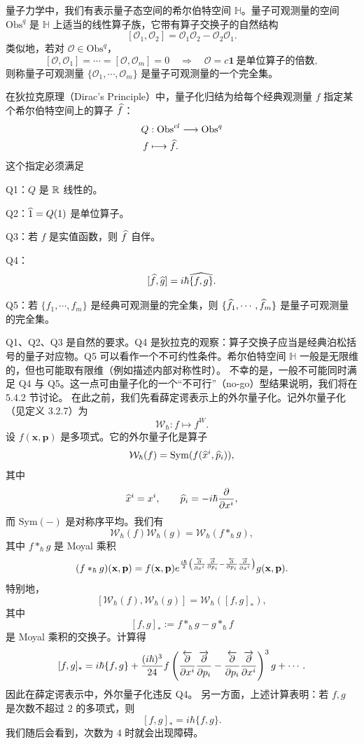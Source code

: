 量子力学中，我们有表示量子态空间的希尔伯特空间 $\mathbb{H}$。量子可观测量的空间
$\mathrm{Obs}^{q}$ 是 $\mathbb{H}$ 上适当的线性算子族，它带有算子交换子的自然结构
\[
[\mathcal{O}_1,\mathcal{O}_2]
=\mathcal{O}_1\mathcal{O}_2-\mathcal{O}_2\mathcal{O}_1.
\]
类似地，若对 $\mathcal{O}\in\mathrm{Obs}^{q}$，
\[
[\mathcal{O},\mathcal{O}_1]=\cdots=[\mathcal{O},\mathcal{O}_m]=0
\quad\Longrightarrow\quad
\mathcal{O}=c\mathbf{1}\ \text{是单位算子的倍数},
\]
则称量子可观测量 $\{\mathcal{O}_1,\cdots,\mathcal{O}_m\}$ 是量子可观测量的一个完全集。

在狄拉克原理（Dirac's Principle）中，量子化归结为给每个经典观测量 $f$ 指定某个希尔伯特空间上的算子 $\widehat{f}$：
\[
\begin{aligned}
Q&:\mathrm{Obs}^{cl}\longrightarrow\mathrm{Obs}^{q}\\
f&\longmapsto\widehat{f}.
\end{aligned}
\]
这个指定必须满足

Q1：$Q$ 是 $\mathbb{R}$ 线性的。

Q2：$\widehat{1}=Q(1)$ 是单位算子。

Q3：若 $f$ 是实值函数，则 $\widehat{f}$ 自伴。

Q4：
\[
[\widehat{f},\widehat{g}]=i\hbar\widehat{\{f,g\}}.
\]

Q5：若 $\{f_1,\cdots,f_m\}$ 是经典可观测量的完全集，则
$\{\widehat{f}_1,\cdots,\widehat{f}_m\}$ 是量子可观测量的完全集。

Q1、Q2、Q3 是自然的要求。Q4 是狄拉克的观察：算子交换子应当是经典泊松括号的量子对应物。Q5 可以看作一个不可约性条件。希尔伯特空间 $\mathbb{H}$ 一般是无限维的，但也可能取有限维（例如描述内部对称性时）。
不幸的是，一般不可能同时满足 Q4 与 Q5。这一点可由量子化的一个“不可行”（no-go）型结果说明，我们将在 5.4.2 节讨论。
在此之前，我们先看薛定谔表示上的外尔量子化。记外尔量子化（见定义 3.2.7）为
\[
\mathcal{W}_\hbar:f\mapsto f^W.
\]
设 $f(\mathbf x,\mathbf p)$ 是多项式。它的外尔量子化是算子
\[
\mathcal{W}_\hbar(f)=\mathrm{Sym}(f(\widehat{x}^i,\widehat{p}_i)),
\]
其中
\[
\widehat{x}^i=x^i,\qquad \widehat{p}_i=-i\hbar\frac{\partial}{\partial x^i},
\]
而 $\mathrm{Sym}(-)$ 是对称序平均。我们有
\[
\mathcal{W}_\hbar(f)\mathcal{W}_\hbar(g)=\mathcal{W}_\hbar(f*_\hbar g),
\]
其中 $f*_\hbar g$ 是 Moyal 乘积
\[
(f*_\hbar g)(\mathbf x,\mathbf p)
=f(\mathbf x,\mathbf p)
e^{\frac{i\hbar}{2}\left(\frac{\overleftarrow{\partial}}{\partial x^i}
\frac{\overrightarrow{\partial}}{\partial p_i}
-\frac{\overleftarrow{\partial}}{\partial p_i}
\frac{\overrightarrow{\partial}}{\partial x^i}\right)}
g(\mathbf x,\mathbf p).
\]
特别地，
\[
[\mathcal{W}_\hbar(f),\mathcal{W}_\hbar(g)]
=\mathcal{W}_\hbar([f,g]_*),
\]
其中
\[
[f,g]_*:=f*_\hbar g-g*_\hbar f
\]
是 Moyal 乘积的交换子。计算得
\[
[f,g]_*=i\hbar\{f,g\}
+\frac{(i\hbar)^3}{24}f\left(\frac{\overleftarrow{\partial}}{\partial x^i}
\frac{\overrightarrow{\partial}}{\partial p_i}
-\frac{\overleftarrow{\partial}}{\partial p_i}
\frac{\overrightarrow{\partial}}{\partial x^i}\right)^3g+\cdots.
\]
因此在薛定谔表示中，外尔量子化违反 Q4。
另一方面，上述计算表明：若 $f,g$ 是次数不超过 $2$ 的多项式，则
\[
[f,g]_*=i\hbar\{f,g\}.
\]
我们随后会看到，次数为 $4$ 时就会出现障碍。


